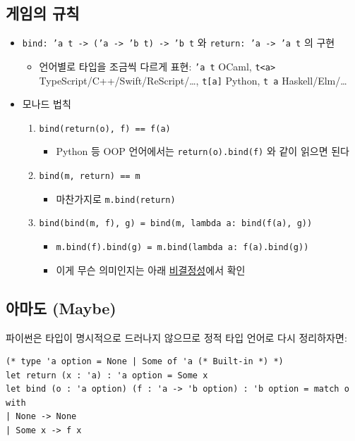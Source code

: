 \documentclass[a4paper,11pt]{article}
\begin{document}
\subsection{게임의 규칙}
\label{sec:orgd8ac2eb}
\begin{itemize}
\item \texttt{bind: 'a t -> ('a -> 'b t) -> 'b t} 와 \texttt{return: 'a -> 'a t} 의 구현
\begin{itemize}
\item 언어별로 타입을 조금씩 다르게 표현: \texttt{'a t} OCaml, \texttt{t<a>} TypeScript/C++/Swift/ReScript/\ldots{}, \texttt{t[a]} Python, \texttt{t a} Haskell/Elm/\ldots{}
\end{itemize}
\item 모나드 법칙
\begin{enumerate}
\item \texttt{bind(return(o), f) == f(a)}
\begin{itemize}
\item Python 등 OOP 언어에서는 \texttt{return(o).bind(f)} 와 같이 읽으면 된다
\end{itemize}
\item \texttt{bind(m, return) == m}
\begin{itemize}
\item 마찬가지로 \texttt{m.bind(return)}
\end{itemize}
\item \texttt{bind(bind(m, f), g) = bind(m, lambda a: bind(f(a), g))}
\begin{itemize}
\item \texttt{m.bind(f).bind(g) = m.bind(lambda a: f(a).bind(g))}
\item 이게 무슨 의미인지는 아래 \hyperref[org9729d4a]{비결정성}에서 확인
\end{itemize}
\end{enumerate}
\end{itemize}

\subsection{아마도 (Maybe)}
\label{sec:orgba3c8b1}
파이썬은 타입이 명시적으로 드러나지 않으므로 정적 타입 언어로 다시 정리하자면:
\begin{verbatim}
(* type 'a option = None | Some of 'a (* Built-in *) *)
let return (x : 'a) : 'a option = Some x
let bind (o : 'a option) (f : 'a -> 'b option) : 'b option = match o with
| None -> None
| Some x -> f x
\end{verbatim}
\end{document}
